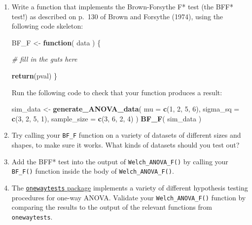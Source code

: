 \documentclass[
]{book}
\newenvironment{Shaded}{\begin{snugshade}}{\end{snugshade}}
\newcommand{\AttributeTok}[1]{\textcolor[rgb]{0.13,0.29,0.53}{#1}}
\newcommand{\CommentTok}[1]{\textcolor[rgb]{0.56,0.35,0.01}{\textit{#1}}}
\newcommand{\ControlFlowTok}[1]{\textcolor[rgb]{0.13,0.29,0.53}{\textbf{#1}}}
\newcommand{\DecValTok}[1]{\textcolor[rgb]{0.00,0.00,0.81}{#1}}
\newcommand{\FunctionTok}[1]{\textcolor[rgb]{0.13,0.29,0.53}{\textbf{#1}}}
\newcommand{\NormalTok}[1]{#1}
\newcommand{\OtherTok}[1]{\textcolor[rgb]{0.56,0.35,0.01}{#1}}
\begin{document}
\begin{enumerate}
\def\labelenumi{\arabic{enumi}.}
\item
  Write a function that implements the Brown-Forsythe F* test (the BFF* test!) as described on p.~130 of Brown and Forsythe (1974), using the following code skeleton:

\begin{Shaded}
\begin{Highlighting}[]
\NormalTok{BF\_F }\OtherTok{\textless{}{-}} \ControlFlowTok{function}\NormalTok{( data ) \{}

  \CommentTok{\# fill in the guts here}

  \FunctionTok{return}\NormalTok{(pval)}
\NormalTok{\}}
\end{Highlighting}
\end{Shaded}

  Run the following code to check that your function produces a result:

\begin{Shaded}
\begin{Highlighting}[]
\NormalTok{sim\_data }\OtherTok{\textless{}{-}} \FunctionTok{generate\_ANOVA\_data}\NormalTok{(}
  \AttributeTok{mu =} \FunctionTok{c}\NormalTok{(}\DecValTok{1}\NormalTok{, }\DecValTok{2}\NormalTok{, }\DecValTok{5}\NormalTok{, }\DecValTok{6}\NormalTok{), }
  \AttributeTok{sigma\_sq =} \FunctionTok{c}\NormalTok{(}\DecValTok{3}\NormalTok{, }\DecValTok{2}\NormalTok{, }\DecValTok{5}\NormalTok{, }\DecValTok{1}\NormalTok{),}
  \AttributeTok{sample\_size =} \FunctionTok{c}\NormalTok{(}\DecValTok{3}\NormalTok{, }\DecValTok{6}\NormalTok{, }\DecValTok{2}\NormalTok{, }\DecValTok{4}\NormalTok{)}
\NormalTok{)}
\FunctionTok{BF\_F}\NormalTok{( sim\_data )}
\end{Highlighting}
\end{Shaded}
\item
  Try calling your \texttt{BF\_F} function on a variety of datasets of different sizes and shapes, to make sure it works. What kinds of datasets should you test out?
\item
  Add the BFF* test into the output of \texttt{Welch\_ANOVA\_F()} by calling your \texttt{BF\_F()} function inside the body of \texttt{Welch\_ANOVA\_F()}.
\item
  The \href{https://cran.r-project.org/package=onewaytests}{\texttt{onewaytests} package} implements a variety of different hypothesis testing procedures for one-way ANOVA. Validate your \texttt{Welch\_ANOVA\_F()} function by comparing the results to the output of the relevant functions from \texttt{onewaytests}.
\end{enumerate}
\end{document}
